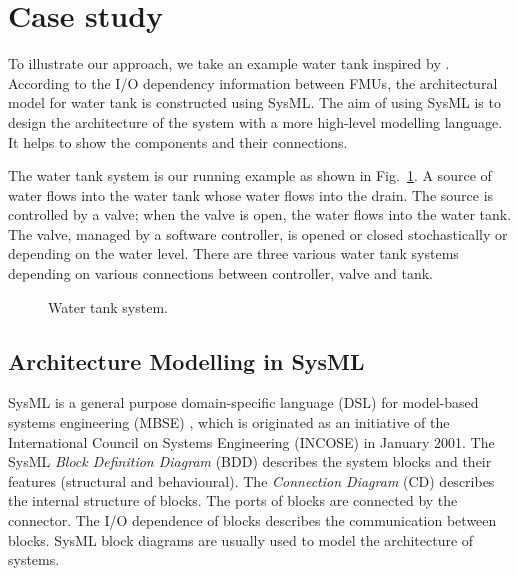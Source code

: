 
\section{Case study}
\label{sec:sysml}
To illustrate our approach, we take an example water tank inspired by \cite{AmalioPCW16}. According to the I/O dependency information between FMUs, the architectural model for water tank is constructed using SysML. The aim of using SysML is to design the architecture of the system with a more high-level modelling language. It helps to show the components and their connections.

The water tank system is our running example as shown in Fig.~\ref{tankfig}. A source of water flows into the water tank whose water flows into the drain. The source is controlled by a valve; when the valve is open, the water flows into the water tank. The valve, managed by a software controller, is opened or closed stochastically or depending on the water level. There are three various water tank systems depending on various connections between controller, valve and tank. 
\begin{figure}[htbp]
	\caption{Water tank system.}
	\label{tankfig}
\end{figure}
\subsection{Architecture Modelling in SysML}
SysML is a general purpose domain-specific language (DSL) \cite{SemerathBHSV17} for model-based systems engineering (MBSE) \cite{Dori16}, which is originated as an initiative of the International Council on Systems Engineering (INCOSE) \cite{Pepper2015International} in January 2001. The SysML \textit{Block Definition Diagram} (BDD) describes the system blocks and their features (structural and behavioural). The \textit{Connection Diagram} (CD) describes the internal structure of blocks. The ports of blocks are connected by the connector. The I/O dependence of blocks describes the communication between blocks. SysML block diagrams are usually used to model the architecture of systems.

